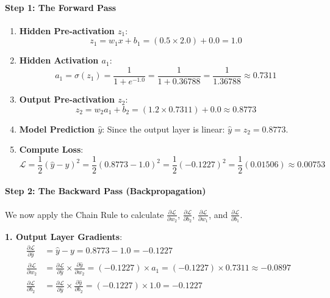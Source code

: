 \paragraph{Step 1: The Forward Pass}
\begin{enumerate}
    \item \textbf{Hidden Pre-activation $z_1$}:
    \begin{equation*}
    z_1 = w_1 x + b_1 = (0.5 \times 2.0) + 0.0 = 1.0
    \end{equation*}
    \item \textbf{Hidden Activation $a_1$}:
    \begin{equation*}
    a_1 = \sigma(z_1) = \frac{1}{1 + e^{-1.0}} = \frac{1}{1 + 0.36788} = \frac{1}{1.36788} \approx \mathbf{0.7311}
    \end{equation*}
    \item \textbf{Output Pre-activation $z_2$}:
    \begin{equation*}
    z_2 = w_2 a_1 + b_2 = (1.2 \times 0.7311) + 0.0 \approx \mathbf{0.8773}
    \end{equation*}
    \item \textbf{Model Prediction $\hat{y}$}:
    Since the output layer is linear: $\hat{y} = z_2 = \mathbf{0.8773}$.
    \item \textbf{Compute Loss}:
    \begin{equation*}
    \mathcal{L} = \frac{1}{2}(\hat{y} - y)^2 = \frac{1}{2}(0.8773 - 1.0)^2 = \frac{1}{2}(-0.1227)^2 = \frac{1}{2}(0.01506) \approx \mathbf{0.00753}
    \end{equation*}
\end{enumerate}

\paragraph{Step 2: The Backward Pass (Backpropagation)}
We now apply the Chain Rule to calculate $\frac{\partial \mathcal{L}}{\partial w_2}$, $\frac{\partial \mathcal{L}}{\partial b_2}$, $\frac{\partial \mathcal{L}}{\partial w_1}$, and $\frac{\partial \mathcal{L}}{\partial b_1}$.

\textbf{1. Output Layer Gradients}:
\begin{align*}
\frac{\partial \mathcal{L}}{\partial \hat{y}} &= \hat{y} - y = 0.8773 - 1.0 = -0.1227 \\
\frac{\partial \mathcal{L}}{\partial w_2} &= \frac{\partial \mathcal{L}}{\partial \hat{y}} \times \frac{\partial \hat{y}}{\partial w_2} = (-0.1227) \times a_1 = (-0.1227) \times 0.7311 \approx \mathbf{-0.0897} \\
\frac{\partial \mathcal{L}}{\partial b_2} &= \frac{\partial \mathcal{L}}{\partial \hat{y}} \times \frac{\partial \hat{y}}{\partial b_2} = (-0.1227) \times 1.0 = \mathbf{-0.1227}
\end{align*}

